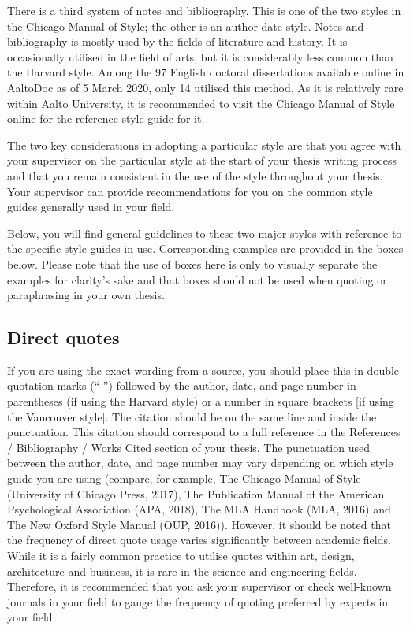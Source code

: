 \documentclass[english, 12pt, a4paper, elec, utf8, a-2b, online]{aaltothesis}
\begin{document}
There is a third system of notes and bibliography. This is one of the two styles
in the Chicago Manual of Style; the other is an author-date style. Notes and 
bibliography is mostly used by the fields of literature and history. It is 
occasionally utilised in the field of arts, but it is considerably less common 
than the Harvard style. Among the 97 English doctoral dissertations available 
online in AaltoDoc as of 5 March 2020, only 14 utilised this method. As it is 
relatively rare within Aalto University, it is recommended to visit the Chicago 
Manual of Style online for the reference style guide for it.

The two key considerations in adopting a particular style are that you agree 
with your supervisor on the particular style at the start of your thesis writing
process and that you remain consistent in the use of the style throughout your 
thesis. Your supervisor can provide recommendations for you on the common style 
guides generally used in your field.

Below, you will find general guidelines to these two major styles with reference
to the specific style guides in use. Corresponding examples are provided in the 
boxes below. Please note that the use of boxes here is only to visually separate
the examples for clarity’s sake and that boxes should not be used when quoting 
or paraphrasing in your own thesis.


\subsection*{Direct quotes}

If you are using the exact wording from a source, you should place this in 
double quotation marks (“ ”) followed by the author, date, and page number in 
parentheses (if using the Harvard style) or a number in square brackets [if 
using the Vancouver style]. The citation should be on the same line and inside 
the punctuation. This citation should correspond to a full reference in the 
References / Bibliography / Works Cited section of your thesis. The punctuation 
used between the author, date, and page number may vary depending on which style
guide you are using (compare, for example, The Chicago Manual of Style 
(University of Chicago Press, 2017), The Publication Manual of the American 
Psychological Association (APA, 2018), The MLA Handbook (MLA, 2016) and The New 
Oxford Style Manual (OUP, 2016)). However, it should be noted that the frequency
of direct quote usage varies significantly between academic fields. While it is 
a fairly common practice to utilise quotes within art, design, architecture and 
business, it is rare in the science and engineering fields. Therefore, it is 
recommended that you ask your supervisor or check well-known journals in your 
field to gauge the frequency of quoting preferred by experts in your field.
\end{document}
